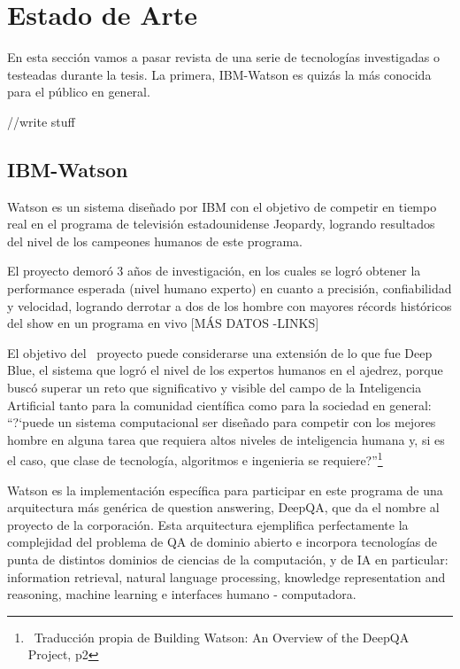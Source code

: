 \chapter{Estado de Arte}
\label{chap:estado-de-arte}
En esta secci\'on vamos a pasar revista de una serie de tecnolog\'ias
investigadas o testeadas durante la tesis. La primera, IBM-Watson es
quiz\'as la m\'as conocida para el p\'ublico en general. 


//write stuff\newline


\section{IBM-Watson}

Watson es un sistema dise\~nado por IBM con el objetivo de competir en
tiempo real en el programa de televisi\'on estadounidense Jeopardy,
logrando resultados del nivel de los campeones humanos de este
programa.

El proyecto demor\'o 3 a\~nos de investigaci\'on, en los cuales se
logr\'o obtener la performance esperada (nivel humano experto) en
cuanto a precisi\'on, confiabilidad y velocidad, logrando derrotar a
dos de los hombre con mayores r\'ecords hist\'oricos del show en un
programa en vivo [M\'AS DATOS -LINKS]

El objetivo del \ proyecto puede considerarse una extensi\'on de lo que
fue Deep Blue, el sistema que logr\'o el nivel de los expertos humanos
en el ajedrez, porque busc\'o superar un reto que significativo y
visible del campo de la Inteligencia Artificial tanto para la comunidad
cient\'ifica como para la sociedad en general:
{\textquotedblleft}?`puede un sistema computacional ser dise\~nado para
competir con los mejores hombre en alguna tarea que requiera altos
niveles de inteligencia humana y, si es el caso, que clase de
tecnolog\'ia, algoritmos e ingenieria se
requiere?{\textquotedblright}\footnote{\ Traducci\'on propia de
Building Watson: An Overview of the DeepQA Project, p2}

Watson es la implementaci\'on espec\'ifica para participar en este
programa de una arquitectura m\'as gen\'erica de question answering,
DeepQA, que da el nombre al proyecto de la corporaci\'on. Esta
arquitectura ejemplifica perfectamente la complejidad del problema de
QA de dominio abierto e incorpora tecnolog\'ias de punta de distintos
dominios de ciencias de la computaci\'on, y de IA en particular:
information retrieval, natural language processing, knowledge
representation and reasoning, machine learning e interfaces humano -
computadora.


